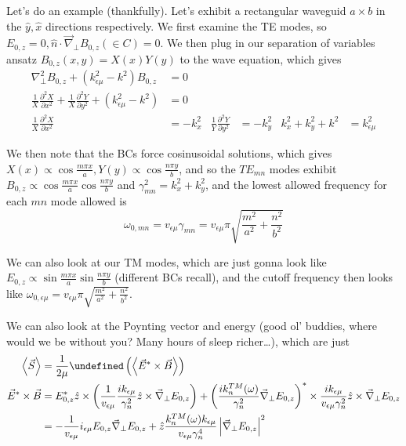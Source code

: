 \documentclass[10pt]{report}
\newcommand{\ptd}[2]{\frac{\partial^2 #1}{\partial#2^2}}
\let\Re\undefined
\DeclareMathOperator{\Re}{Re}
\newcommand{\expvalue}[1]{\left<#1\right>}
\newcommand{\abs}[1]{\left|#1\right|}
\begin{document}
Let's do an example (thankfully). Let's exhibit a rectangular waveguid $a \times b$ in the $\hat{y}, \hat{x}$ directions respectively. We first examine the TE modes, so $E_{0,z} = 0, \hat{n} \cdot \vec{\nabla}_{\perp}B_{0,z}(\in C) = 0$. We then plug in our separation of variables ansatz $B_{0,z}(x,y) = X(x)Y(y)$ to the wave equation, which gives
\begin{align}
    \nabla_\perp^2 B_{0,z} + \left( k_{\epsilon\mu}^2 - k^2 \right)B_{0,z} &= 0\\
    \frac{1}{X}\ptd{X}{x} + \frac{1}{X} \ptd{Y}{y} + \left( k_{\epsilon \mu}^2 - k^2 \right) &= 0\\
    \frac{1}{X}\ptd{X}{x} &= -k_x^2 & \frac{1}{Y}\ptd{Y}{y} &= -k_y^2 & k_x^2 + k_y^2 + k^2 &= k_{\epsilon \mu}^2
\end{align}

We then note that the BCs force cosinusoidal solutions, which gives $X(x) \propto \cos \frac{m\pi x}{a}, Y(y) \propto \cos \frac{n\pi y}{b}$, and so the $TE_{mn}$ modes exhibit $B_{0,z} \propto \cos \frac{m\pi x}{a}\cos \frac{n\pi y}{b}$ and $\gamma_{mn}^2 = k_x^2 + k_y^2$, and the lowest allowed frequency for each $mn$ mode allowed is 
\begin{equation}
    \omega_{0,mn} = v_{\epsilon \mu}\gamma_{mn} = v_{\epsilon \mu}\pi\sqrt{\frac{m^2}{a^2} + \frac{n^2}{b^2}}
\end{equation}

We can also look at our TM modes, which are just gonna look like $E_{0,z} \propto \sin \frac{m\pi x}{a}\sin \frac{n\pi y}{b}$ (different BCs recall), and the cutoff frequency then looks like $\omega_{0,\epsilon \mu} = v_{\epsilon \mu}\pi\sqrt{\frac{m^2}{a^2} + \frac{n^2}{b^2}}$. 

We can also look at the Poynting vector and energy (good ol' buddies, where would we be without you? Many hours of sleep richer\dots), which are just
\begin{align}
    \expvalue{\vec{S}} &= \frac{1}{2\mu} \Re\left( \expvalue{\vec{E}^* \times \vec{B}} \right)\\
    \vec{E} ^* \times \vec{B} &= E_{0,z}^*\hat{z} \times \left( \frac{1}{v_{\epsilon \mu}}\frac{ik_{\epsilon \mu}}{\gamma_n^2}\hat{z} \times \vec{\nabla} _{\perp}E_{0,z} \right) + \left( \frac{ik_n^{TM}(\omega)}{\gamma_n^2}\vec{\nabla}_{\perp}E_{0,z} \right)^* \times \frac{ik_{\epsilon \mu}}{v_{\epsilon \mu}\gamma_n^2}\hat{z} \times \vec{\nabla}_{\perp}E_{0,z}\\
    &= -\frac{1}{v_{\epsilon \mu}} i_{\epsilon \mu} E_{0,z} \vec{\nabla} _{\perp}E_{0,z} + \hat{z}\frac{k_n^{TM}(\omega)k_{\epsilon \mu}}{v_{\epsilon \mu}\gamma_n^4}\abs{\vec{\nabla}_{\perp}E_{0,z}}^2
\end{align}
\end{document}
